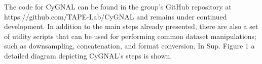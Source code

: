 The code for CyGNAL can be found in the group’s GitHub repository at  https://github.com/TAPE-Lab/CyGNAL and remains under continued development. In addition to the main steps already presented, there are also a set of utility scripts that can be used for performing common dataset manipulations; such as downsampling, concatenation, and format conversion. In Sup. Figure 1 a detailed diagram depicting CyGNAL’s steps is shown.








        
        
